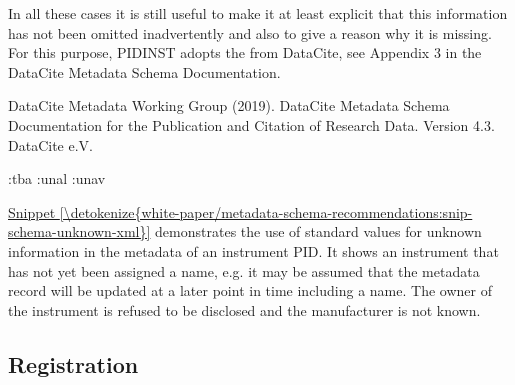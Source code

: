 \documentclass[a4paper,10pt,english]{sphinxmanual}
\begin{document}
In all these cases it is still useful to make it at least explicit
that this information has not been omitted inadvertently and also to
give a reason why it is missing.  For this purpose, PIDINST adopts the
 from DataCite, see Appendix
3 in the DataCite Metadata Schema Documentation. %
\begin{footnote}[3]\sphinxAtStartFootnote
DataCite Metadata Working Group (2019).  DataCite Metadata Schema
Documentation for the Publication and Citation of Research Data.
Version 4.3.  DataCite e.V.  
%
\end{footnote}
\def\sphinxLiteralBlockLabel{\label{\detokenize{white-paper/metadata-schema-recommendations:id6}}\label{\detokenize{white-paper/metadata-schema-recommendations:snip-schema-unknown-xml}}}
\begin{sphinxVerbatim}[commandchars=\\\{\}]
  :tba
        :unal
        :unav
\end{sphinxVerbatim}

\hyperref[\detokenize{white-paper/metadata-schema-recommendations:snip-schema-unknown-xml}]{Snippet \ref{\detokenize{white-paper/metadata-schema-recommendations:snip-schema-unknown-xml}}} demonstrates the use of standard
values for unknown information in the metadata of an instrument PID.
It shows an instrument that has not yet been assigned a name, e.g. it
may be assumed that the metadata record will be updated at a later
point in time including a name.  The owner of the instrument is
refused to be disclosed and the manufacturer is not known.


\subsection{Registration}
\label{\detokenize{white-paper/registration:registration}}\label{\detokenize{white-paper/registration::doc}}
\end{document}
